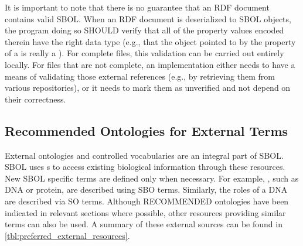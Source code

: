It is important to note that there is no guarantee that an RDF document
contains valid SBOL. When an RDF document is deserialized to SBOL
objects, the program doing so SHOULD verify that all of the property
values encoded therein have the right data type (e.g., that the object
pointed to by the  property of a
 is really a ).
For complete files, this validation can be carried out entirely locally. For files that are not complete, an implementation either needs to
have a means of validating those external references (e.g., by
retrieving them from various repositories), or it needs to mark them as
unverified and not depend on their correctness.

\subsection{Recommended Ontologies for External Terms}
\label{sec:recomm_ontologies}

External ontologies and controlled vocabularies are an integral part of SBOL. SBOL uses s to access existing biological information through these resources. New SBOL specific terms are defined only when necessary. For example,  , such as DNA or protein, are described using SBO terms. Similarly, the roles of a DNA   are described via SO terms. Although RECOMMENDED ontologies have been indicated in relevant sections where possible, other resources providing similar terms can also be used. A summary of these external sources can be found in \ref{tbl:preferred_external_resources}.

